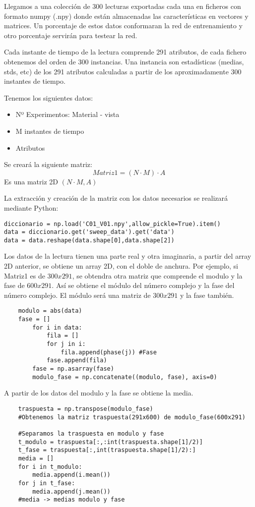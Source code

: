 Llegamos a una colección de 300 lecturas exportadas cada una en ficheros con formato numpy (.npy) donde están almacenadas las características en vectores y matrices. Un porcentaje de estos datos conformaran la red de entrenamiento y otro porcentaje servirán para testear la red.

Cada instante de tiempo de la lectura comprende 291 atributos, de cada fichero obtenemos del orden de 300 instancias.
Una instancia son estadísticas (medias, stds, etc) de los 291 atributos calculadas a partir de los aproximadamente 300 instantes de tiempo.

Tenemos los siguientes datos:
\begin{itemize}
\item Nº Experimentos: Material - vista
\item M instantes de tiempo
\item Atributos
\end{itemize}

Se creará la siguiente matriz:
\begin{equation}
	Matriz1 = (N \cdot M) \cdot A
\end{equation}
Es una matriz 2D $(N \cdot M,A)$

La extracción y creación de la matriz con los datos necesarios se realizará mediante Python:

\begin{verbatim}
diccionario = np.load('C01_V01.npy',allow_pickle=True).item()
data = diccionario.get('sweep_data').get('data')
data = data.reshape(data.shape[0],data.shape[2])
\end{verbatim}

Los datos de la lectura tienen una parte real y otra imaginaria, a partir del array 2D anterior, se obtiene un array 2D, con el doble de anchura.
Por ejemplo, si Matriz1 es de $ 300 x 291 $, se obtendra otra matriz que comprende el modulo y la fase de $ 600 x 291 $. Así se obtiene el módulo del número complejo y la fase del número complejo.
El módulo será una matriz de $ 300 x 291 $ y la fase también.

\begin{verbatim}
	modulo = abs(data)
	fase = []
		for i in data:
			fila = []
			for j in i:
				fila.append(phase(j)) #Fase
			fase.append(fila)
   	 	fase = np.asarray(fase)
   	 	modulo_fase = np.concatenate((modulo, fase), axis=0)
\end{verbatim}

A partir de los datos del modulo y la fase se obtiene la media.
\begin{verbatim}
	traspuesta = np.transpose(modulo_fase)
	#Obtenemos la matriz traspuesta(291x600) de modulo_fase(600x291)

	#Separamos la traspuesta en modulo y fase
	t_modulo = traspuesta[:,:int(traspuesta.shape[1]/2)]
	t_fase = traspuesta[:,int(traspuesta.shape[1]/2):]
	media = []
	for i in t_modulo:
    	media.append(i.mean())
	for j in t_fase:
    	media.append(j.mean())
	#media -> medias modulo y fase
\end{verbatim}



